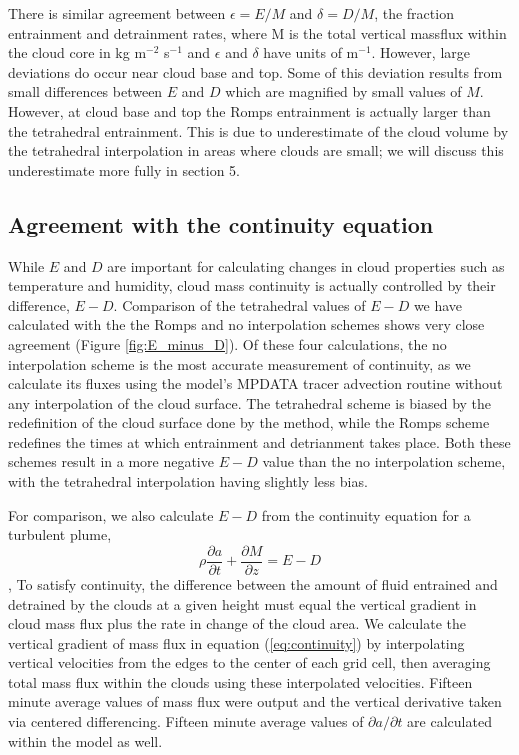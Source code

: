 \documentclass[12pt]{article}
\begin{document}
There is similar agreement between $\epsilon = E/M$ and $\delta = D/M$, the 
fraction entrainment and detrainment rates, where M is the total vertical 
massflux within the cloud core in kg m$^{-2}$ s$^{-1}$ and $\epsilon$ and 
$\delta$ have units of m$^{-1}$.  However, large deviations do occur near 
cloud base and top. Some of this deviation results from small differences 
between $E$ and $D$ which are magnified by small values of $M$.  However, at
cloud base and top the Romps entrainment is actually larger than the
tetrahedral entrainment.  This is due to underestimate of the cloud volume 
by the tetrahedral interpolation in areas where clouds are small; we will 
discuss this underestimate more fully in section 5.  

\subsection{Agreement with the continuity equation}

While $E$ and $D$ are important for calculating changes in cloud properties 
such as temperature and humidity, cloud mass continuity is actually 
controlled by their difference, $E-D$.  Comparison of the tetrahedral values 
of $E-D$ we have calculated with the the Romps and no interpolation schemes
shows very close agreement (Figure \ref{fig:E_minus_D}).  Of these four 
calculations, the no interpolation scheme is the most accurate measurement of
continuity, as we calculate its fluxes using the model's MPDATA tracer 
advection routine \citep{Smolarkiewicz1990, Khairoutdinov2003} without any 
interpolation of the cloud surface.  The tetrahedral scheme is biased by the 
redefinition of the cloud surface done by the method, while the Romps scheme 
redefines the times at which entrainment and detrianment takes place.  Both 
these schemes result in a more negative $E-D$ value than the no interpolation 
scheme, with the tetrahedral interpolation having slightly less bias.

For comparison, we also calculate $E-D$ from the continuity equation for a 
turbulent plume, 
\begin{equation}
    \label{eq:continuity}
    \rho \frac{\partial a}{\partial t} 
    + \frac{\partial M}{\partial z}
    = E - D
\end{equation},
To satisfy continuity, the difference between the amount of fluid 
entrained and detrained by the clouds at a given height must equal the 
vertical gradient in cloud mass flux plus the rate in change of the cloud area.
We calculate the vertical gradient of mass flux in equation 
(\ref{eq:continuity}) by interpolating vertical velocities from the edges to 
the center of each grid cell, then averaging total mass flux within the clouds 
using these interpolated velocities.  Fifteen minute average values of mass 
flux were output and the vertical derivative taken via centered differencing.  
Fifteen minute average values of $\partial a/\partial t$ are calculated within 
the model as well.  
\end{document}

